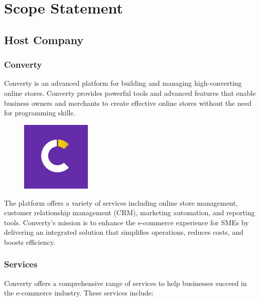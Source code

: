 \chapter{Scope Statement}

\section{Host Company}
\subsection{Converty}
Converty is an advanced platform for building and managing high-converting online stores. Converty provides powerful tools and advanced features that enable business owners and merchants to create effective online stores without the need for programming skills.

\begin{figure}[h]
  \centering
  \includegraphics[width=0.3\textwidth]{Images/convertyLogo.jpeg}
  \label{fig:Converty Logo}
\end{figure}

The platform offers a variety of services including online store management, customer relationship management (CRM), marketing automation, and reporting tools. Converty's mission is to enhance the e-commerce experience for SMEs by delivering an integrated solution that simplifies operations, reduces costs, and boosts efficiency.
\newline

\subsection{Services}
Converty offers a comprehensive range of services to help businesses succeed in the e-commerce industry. These services include:

